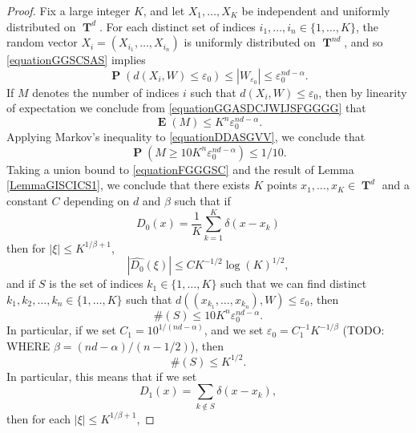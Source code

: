 \documentclass[12pt,reqno]{article}
\numberwithin{equation}{section}
\DeclareMathOperator{\TT}{\mathbf{T}}
\DeclareMathOperator{\EE}{\mathbf{E}}
\DeclareMathOperator{\PP}{\mathbf{P}}
\begin{document}
\begin{proof}
    Fix a large integer $K$, and let $X_1, \dots, X_K$ be independent and uniformly distributed on $\TT^d$. For each distinct set of indices $i_1, \dots, i_n \in \{ 1, \dots, K \}$, the random vector $X_i = (X_{i_1}, \dots, X_{i_n})$ is uniformly distributed on $\TT^{nd}$, and so \eqref{equationGGSCSAS} implies
    \begin{equation} \label{equationGGASDCJWIJSFGGGG}
        \PP(d(X_i,W) \leq \varepsilon_0) \leq |W_{\varepsilon_0}| \leq \varepsilon_0^{nd - \alpha}.
    \end{equation}
    If $M$ denotes the number of indices $i$ such that $d(X_i,W) \leq \varepsilon_0$, then by linearity of expectation we conclude from \eqref{equationGGASDCJWIJSFGGGG} that
    \begin{equation} \label{equationDDASGVV}
        \EE(M) \leq K^n \varepsilon_0^{nd - \alpha}.
    \end{equation}
    Applying Markov's inequality to \eqref{equationDDASGVV}, we conclude that
    \begin{equation} \label{equationFGGGSC}
        \PP(M \geq 10 K^n \varepsilon_0^{nd - \alpha}) \leq 1/10.
    \end{equation}
    Taking a union bound to \eqref{equationFGGGSC} and the result of Lemma \ref{LemmaGISCICS1}, we conclude that there exists $K$ points $x_1, \dots, x_K \in \TT^d$ and a constant $C$ depending on $d$ and $\beta$ such that if
    \[ D_0(x) = \frac{1}{K} \sum_{k = 1}^K \delta(x - x_k) \]
    then for $|\xi| \leq K^{1/\beta + 1}$,
    \begin{equation} \label{equationGGGISCI11242}
        |\widehat{D_0}(\xi)| \leq C K^{-1/2} \log(K)^{1/2},
    \end{equation}
    and if $S$ is the set of indices $k_1 \in \{ 1, \dots, K \}$ such that we can find distinct $k_1, k_2, \dots, k_n \in \{ 1, \dots, K \}$ such that $d((x_{k_1}, \dots, x_{k_n}), W) \leq \varepsilon_0$, then
    \begin{equation} \label{equationGGSC99124}
        \#(S) \leq 10 K^n \varepsilon_0^{nd-\alpha}.
    \end{equation}
    In particular, if we set $C_1 = 10^{1/(nd-\alpha)}$, and we set $\varepsilon_0 = C_1^{-1} K^{-1/\beta}$ (TODO: WHERE $\beta = (nd - \alpha)/(n-1/2)$), then
    \[ \#(S) \leq K^{1/2}. \]
    In particular, this means that if we set
    \[ D_1(x) = \sum_{k \not \in S} \delta(x - x_k), \]
    then for each $|\xi| \leq K^{1/\beta + 1}$,

\end{proof}
\end{document}
